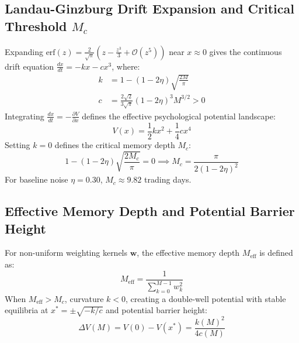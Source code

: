\subsection{Landau-Ginzburg Drift Expansion and Critical Threshold $M_c$}
Expanding $\text{erf}(z) = \frac{2}{\sqrt{\pi}}\left( z - \frac{z^3}{3} + \mathcal{O}(z^5) \right)$ near $x \approx 0$ gives the continuous drift equation $\frac{dx}{dt} = -k x - c x^3$, where:
\begin{align}
    k &= 1 - (1-2\eta)\sqrt{\frac{2M}{\pi}} \\
    c &= \frac{2\sqrt{2}}{3\sqrt{\pi}}(1-2\eta)^3 M^{3/2} > 0
\end{align}
Integrating $\frac{dx}{dt} = -\frac{\partial V}{\partial x}$ defines the effective psychological potential landscape:
\begin{equation}
    V(x) = \frac{1}{2} k x^2 + \frac{1}{4} c x^4
\end{equation}
Setting $k = 0$ defines the critical memory depth $M_c$:
\begin{equation}
    1 - (1-2\eta)\sqrt{\frac{2M_c}{\pi}} = 0 \implies M_c = \frac{\pi}{2(1-2\eta)^2}
\end{equation}
For baseline noise $\eta = 0.30$, $M_c \approx 9.82$ trading days.

\subsection{Effective Memory Depth and Potential Barrier Height}
For non-uniform weighting kernels $\mathbf{w}$, the effective memory depth $M_{\text{eff}}$ is defined as:
\begin{equation}
    M_{\text{eff}} = \frac{1}{\sum_{k=0}^{M-1} w_k^2}
\end{equation}
When $M_{\text{eff}} > M_c$, curvature $k < 0$, creating a double-well potential with stable equilibria at $x^* = \pm \sqrt{-k/c}$ and potential barrier height:
\begin{equation}
    \Delta V(M) = V(0) - V(x^*) = \frac{k(M)^2}{4 c(M)}
\end{equation}
